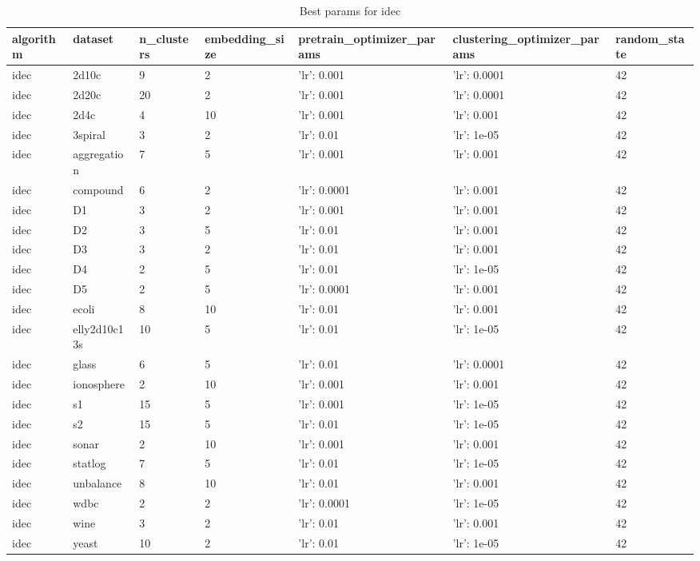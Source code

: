 \begin{table}[H]
\centering
\caption{Best params for idec}
\label{tab:params:idec}
\begin{tabular}{|l|l|l|l|l|l|l|}
\hline
algorithm & dataset & n\_clusters & embedding\_size & pretrain\_optimizer\_params & clustering\_optimizer\_params & random\_state \\
\hline
idec & 2d10c & 9 & 2 & {'lr': 0.001} & {'lr': 0.0001} & 42 \\
\hline
idec & 2d20c & 20 & 2 & {'lr': 0.001} & {'lr': 0.0001} & 42 \\
\hline
idec & 2d4c & 4 & 10 & {'lr': 0.001} & {'lr': 0.001} & 42 \\
\hline
idec & 3spiral & 3 & 2 & {'lr': 0.01} & {'lr': 1e-05} & 42 \\
\hline
idec & aggregation & 7 & 5 & {'lr': 0.001} & {'lr': 0.001} & 42 \\
\hline
idec & compound & 6 & 2 & {'lr': 0.0001} & {'lr': 0.001} & 42 \\
\hline
idec & D1 & 3 & 2 & {'lr': 0.001} & {'lr': 0.001} & 42 \\
\hline
idec & D2 & 3 & 5 & {'lr': 0.01} & {'lr': 0.001} & 42 \\
\hline
idec & D3 & 3 & 2 & {'lr': 0.01} & {'lr': 0.001} & 42 \\
\hline
idec & D4 & 2 & 5 & {'lr': 0.01} & {'lr': 1e-05} & 42 \\
\hline
idec & D5 & 2 & 5 & {'lr': 0.0001} & {'lr': 0.001} & 42 \\
\hline
idec & ecoli & 8 & 10 & {'lr': 0.01} & {'lr': 0.001} & 42 \\
\hline
idec & elly2d10c13s & 10 & 5 & {'lr': 0.01} & {'lr': 1e-05} & 42 \\
\hline
idec & glass & 6 & 5 & {'lr': 0.01} & {'lr': 0.0001} & 42 \\
\hline
idec & ionosphere & 2 & 10 & {'lr': 0.001} & {'lr': 0.001} & 42 \\
\hline
idec & s1 & 15 & 5 & {'lr': 0.001} & {'lr': 1e-05} & 42 \\
\hline
idec & s2 & 15 & 5 & {'lr': 0.01} & {'lr': 1e-05} & 42 \\
\hline
idec & sonar & 2 & 10 & {'lr': 0.001} & {'lr': 0.001} & 42 \\
\hline
idec & statlog & 7 & 5 & {'lr': 0.01} & {'lr': 1e-05} & 42 \\
\hline
idec & unbalance & 8 & 10 & {'lr': 0.01} & {'lr': 0.001} & 42 \\
\hline
idec & wdbc & 2 & 2 & {'lr': 0.0001} & {'lr': 1e-05} & 42 \\
\hline
idec & wine & 3 & 2 & {'lr': 0.01} & {'lr': 0.001} & 42 \\
\hline
idec & yeast & 10 & 2 & {'lr': 0.01} & {'lr': 1e-05} & 42 \\
\hline
\end{tabular}
\end{table}